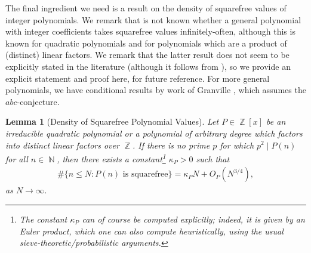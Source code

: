 \documentclass[11pts]{amsart}
\numberwithin{equation}{section}
\newtheorem{lem}{Lemma}[section]
\DeclareMathOperator{\Z}{\mathbb{Z}}
\DeclareMathOperator{\N}{\mathbb{N}}
\begin{document}
The final ingredient we need is a result on the density of squarefree values of integer polynomials. We remark that is not known whether a general polynomial with integer coefficients takes squarefree values infinitely-often, although this is known for quadratic polynomials \cite{Ricci_Quadratic_SF} and for polynomials which are a product of (distinct) linear factors. We remark that the latter result does not seem to be explicitly stated in the literature (although it follows from \cite{Klurman_2017}), so we provide an explicit statement and proof here, for future reference. For more general polynomials, we have conditional results by work of Granville \cite{Granville-twists}, which assumes the $abc$-conjecture.

\begin{lem}[Density of Squarefree Polynomial Values]
    \label{Density_SF}
    Let $P\in\Z[x]$ be an irreducible quadratic polynomial or a polynomial of arbitrary degree which factors into distinct linear factors over $\Z$. If there is no prime $p$ for which $p^2\mid P(n)$ for all $n\in\N$, then there exists a constant\footnote{The constant $\kappa_P$ can of course be computed explicitly; indeed, it is given by an Euler product, which one can also compute heuristically, using the usual sieve-theoretic/probabilistic arguments.} $\kappa_P>0$ such that
\begin{align}
\label{SF_Count_eq}
\#\{n\leq N: \text{$P(n)$ is squarefree}\}
=
\kappa_P N + O_P\left(N^{3/4}\right),
\end{align} 
as $N\rightarrow\infty$.
\end{lem}
\end{document}
